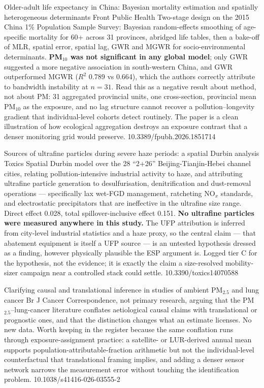 \documentclass[10pt]{article}
\begin{document}
{Older-adult life expectancy in China: Bayesian mortality estimation and spatially heterogeneous determinants}
{Front Public Health}
{Two-stage design on the 2015 China 1\% Population Sample Survey: Bayesian random-effects
smoothing of age-specific mortality for 60+ across 31 provinces, abridged life tables, then
a bake-off of MLR, spatial error, spatial lag, GWR and MGWR for socio-environmental
determinants. \textbf{PM$_{10}$ was not significant in any global model}; only GWR
suggested a more negative association in south-western China, and GWR outperformed MGWR
($R^2$ 0.789 vs 0.664), which the authors correctly attribute to bandwidth instability at
$n=31$. Read this as a negative result about method, not about PM: 31 aggregated provincial
units, one cross-section, provincial mean PM$_{10}$ as the exposure, and no lag structure
cannot recover a pollution--longevity gradient that individual-level cohorts detect
routinely. The paper is a clean illustration of how ecological aggregation destroys an
exposure contrast that a denser monitoring grid would preserve.}
{10.3389/fpubh.2026.1851714}

{Sources of ultrafine particles during severe haze periods: a spatial Durbin analysis}
{Toxics}
{Spatial Durbin model over the 28 ``2+26'' Beijing-Tianjin-Hebei channel cities, relating
pollution-intensive industrial activity to haze, and attributing ultrafine particle
generation to desulfurisation, denitrification and dust-removal operations --- specifically
lax wet-FGD management, ratcheting NO$_x$ standards, and electrostatic precipitators that
are ineffective in the ultrafine size range. Direct effect 0.028, total spillover-inclusive
effect 0.151. \textbf{No ultrafine particles were measured anywhere in this study.}
The UFP attribution is inferred from city-level industrial statistics and a haze proxy, so
the central claim --- that abatement equipment is itself a UFP source --- is an untested
hypothesis dressed as a finding, however physically plausible the ESP argument is. Logged
tier C for the hypothesis, not the evidence; it is exactly the claim a size-resolved
mobility-sizer campaign near a controlled stack could settle.}
{10.3390/toxics14070588}

{Clarifying causal and translational inference in studies of ambient PM$_{2.5}$ and lung cancer}
{Br J Cancer}
{Correspondence, not primary research, arguing that the PM$_{2.5}$--lung-cancer literature
conflates aetiological causal claims with translational or prognostic ones, and that the
distinction changes what an estimate licenses. No new data. Worth keeping in the register
because the same conflation runs through exposure-assignment practice: a satellite- or
LUR-derived annual mean supports population-attributable-fraction arithmetic but not the
individual-level counterfactual that translational framing implies, and adding a denser
sensor network narrows the measurement error without touching the identification problem.}
{10.1038/s41416-026-03555-2}
\end{document}
